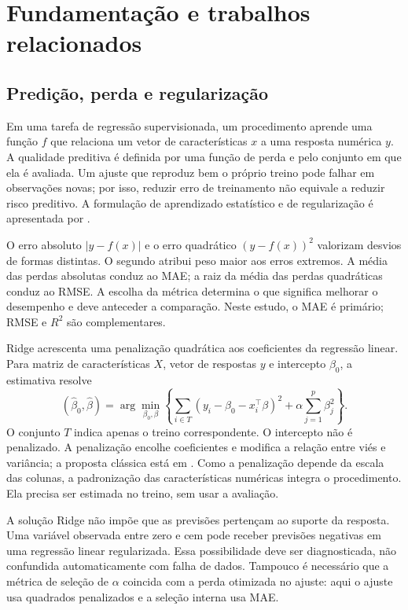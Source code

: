 \chapter{Fundamentação e trabalhos relacionados}\label{cap:fundamentacao}
\section{Predição, perda e regularização}
Em uma tarefa de regressão supervisionada, um procedimento aprende uma função $f$ que relaciona um vetor de características $x$ a uma resposta numérica $y$. A qualidade preditiva é definida por uma função de perda e pelo conjunto em que ela é avaliada. Um ajuste que reproduz bem o próprio treino pode falhar em observações novas; por isso, reduzir erro de treinamento não equivale a reduzir risco preditivo. A formulação de aprendizado estatístico e de regularização é apresentada por \citet{james2023}.

O erro absoluto $|y-f(x)|$ e o erro quadrático $(y-f(x))^2$ valorizam desvios de formas distintas. O segundo atribui peso maior aos erros extremos. A média das perdas absolutas conduz ao MAE; a raiz da média das perdas quadráticas conduz ao RMSE. A escolha da métrica determina o que significa melhorar o desempenho e deve anteceder a comparação. Neste estudo, o MAE é primário; RMSE e $R^2$ são complementares.

Ridge acrescenta uma penalização quadrática aos coeficientes da regressão linear. Para matriz de características $X$, vetor de respostas $y$ e intercepto $\beta_0$, a estimativa resolve
\begin{equation}\label{eq:ridge}
 (\widehat\beta_0,\widehat\beta)=\arg\min_{\beta_0,\beta}
 \left\{\sum_{i\in T}(y_i-\beta_0-x_i^\top\beta)^2+\alpha\sum_{j=1}^{p}\beta_j^2\right\}.
\end{equation}
O conjunto $T$ indica apenas o treino correspondente. O intercepto não é penalizado. A penalização encolhe coeficientes e modifica a relação entre viés e variância; a proposta clássica está em \citet{hoerl1970}. Como a penalização depende da escala das colunas, a padronização das características numéricas integra o procedimento. Ela precisa ser estimada no treino, sem usar a avaliação.

A solução Ridge não impõe que as previsões pertençam ao suporte da resposta. Uma variável observada entre zero e cem pode receber previsões negativas em uma regressão linear regularizada. Essa possibilidade deve ser diagnosticada, não confundida automaticamente com falha de dados. Tampouco é necessário que a métrica de seleção de $\alpha$ coincida com a perda otimizada no ajuste: aqui o ajuste usa quadrados penalizados e a seleção interna usa MAE.

